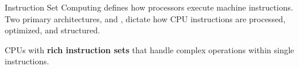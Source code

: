 \begin{NxSBox}
	\begin{NxIDBox}
		Instruction Set Computing defines how processors execute machine instructions. Two primary architectures,  and , dictate how CPU instructions are processed, optimized, and structured.
	\end{NxIDBox}
	\begin{NxIDBoxL}
		 CPUs with \textbf{rich instruction sets} that handle complex operations within single instructions.
	\end{NxIDBoxL}
\end{NxSBox}


%

